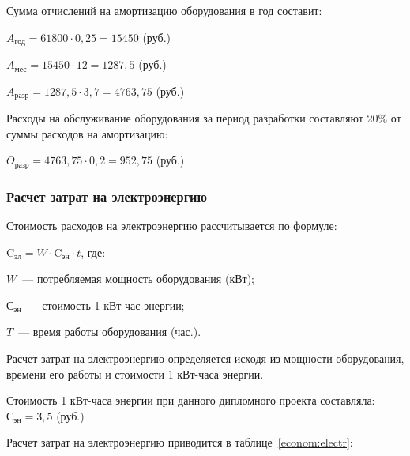 Сумма отчислений на амортизацию оборудования в год составит:

\begin{center}
$ A_\text{год} = 61800 \cdot 0,25 = 15450 $ (руб.)
\end{center}

\begin{center}
$ A_\text{мес} = 15450 \cdot 12 = 1287,5 $ (руб.)
\end{center}

\begin{center}
$ A_\text{разр} = 1287,5 \cdot 3,7 = 4763,75 $ (руб.)
\end{center}

Расходы на обслуживание оборудования за период разработки составляют 20\% от суммы расходов на амортизацию:

\begin{center}
$ O_\text{разр} = 4763,75 \cdot 0,2 = 952,75 $ (руб.)
\end{center}

\subsubsection{Расчет затрат на электроэнергию}
Стоимость расходов на электроэнергию рассчитывается по формуле:

\begin{center}
$ \text{C}_\text{эл} = W \cdot \text{C}_\text{эн} \cdot t$, где:
\end{center}

$W$~--- потребляемая мощность оборудования (кВт);

$\text{С}_\text{эн}$~--- стоимость 1 кВт-час энергии;

$T$~--- время работы оборудования (час.).

Расчет затрат на электроэнергию определяется исходя из мощности оборудования, времени его работы и стоимости 1 кВт-часа энергии.

Стоимость 1 кВт-часа энергии при данного дипломного проекта составляла: $ \text{С}_\text{эн} = 3,5$ (руб.)

Расчет затрат на электроэнергию приводится в таблице~\ref{econom:electr}:


